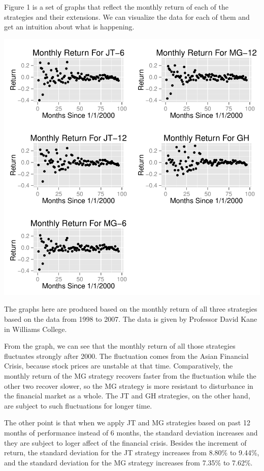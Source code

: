 \documentclass{article}
\begin{document}
Figure 1 is a set of graphs that reflect the monthly return of each of the strategies and their extensions. We can visualize the data for each of them and get an intuition about what is happening.

\begin{center}

\includegraphics{Masterpiece-001}

\small The graphs here are produced based on the monthly return of all three strategies based on the data from 1998 to 2007. The data is given by Professor David Kane in Williams College.

\end{center}

From the graph, we can see that the monthly return of all those strategies fluctuates strongly after 2000. The fluctuation comes from the Asian Financial Crisis, because stock prices are unstable at that time. Comparatively, the monthly return of the MG strategy recovers faster from the fluctuation while the other two recover slower, so the MG strategy is more resistant to disturbance in the financial market as a whole. The JT and GH strategies, on the other hand, are subject to such fluctuations for longer time.

The other point is that when we apply JT and MG strategies based on past 12 months of performance instead of 6 months, the standard deviation increases and they are subject to loger affect of the financial crisis. Besides the increment of return, the standard deviation for the JT strategy increases from 8.80\% to 9.44\%, and the standard deviation for the MG strategy increases from 7.35\% to 7.62\%. 
 
\end{document}
